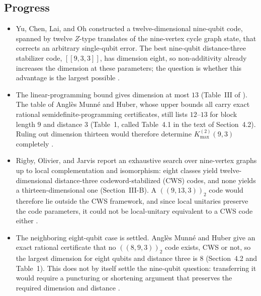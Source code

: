 \subsection*{Progress}

\begin{itemize}
  \item Yu, Chen, Lai, and Oh constructed a twelve-dimensional nine-qubit code,
  spanned by twelve $Z$-type translates of the nine-vertex cycle graph state,
  that corrects an arbitrary single-qubit error.  The best nine-qubit
  distance-three stabilizer code, $[[9,3,3]]$, has dimension eight, so
  non-additivity already increases the dimension at these parameters; the
  question is whether this advantage is the largest possible
  .

  \item The linear-programming bound gives dimension at most $13$ (Table~III of
  ).  The table of Angl\`es Munn\'e and Huber,
  whose upper bounds all carry exact rational semidefinite-programming
  certificates, still lists $12$--$13$ for block length $9$ and distance $3$
  (Table~1, called Table~4.1 in the text of Section~4.2).  Ruling out dimension
  thirteen would therefore determine $K_{\max}^{(2)}(9,3)$ completely
  .

  \item Rigby, Olivier, and Jarvis report an exhaustive search over nine-vertex
  graphs up to local complementation and isomorphism: eight classes yield
  twelve-dimensional distance-three codeword-stabilized (CWS) codes, and none
  yields a thirteen-dimensional one (Section~III-B).  A $((9,13,3))_2$ code
  would therefore lie outside the CWS framework, and since local unitaries
  preserve the code parameters, it could not be local-unitary equivalent to a
  CWS code either .

  \item The neighboring eight-qubit case is settled.  Angl\`es Munn\'e and Huber give
  an exact rational certificate that no $((8,9,3))_2$ code exists, CWS or not, so
  the largest dimension for eight qubits and distance three is $8$
  (Section~4.2 and Table~1).  This does not by itself settle the nine-qubit
  question: transferring it would require a puncturing or shortening argument
  that preserves the required dimension and distance
  .
\end{itemize}

